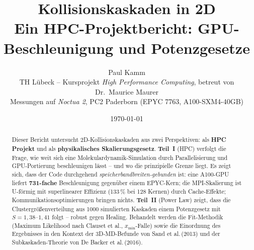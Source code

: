 \documentclass[11pt,a4paper]{article}
\title{Kollisionskaskaden in 2D\\[0.2em]
\large Ein HPC-Projektbericht: GPU-Beschleunigung und Potenzgesetze}
\author{Paul Kamm\\
\small TH L\"ubeck -- Kursprojekt \emph{High Performance Computing}, betreut von Dr.\ Maurice Maurer\\
\small Messungen auf \emph{Noctua 2}, PC2 Paderborn (EPYC 7763, A100-SXM4-40GB)}
\date{\today}
\begin{document}
\maketitle

\begin{abstract}
\noindent
Dieser Bericht untersucht 2D-Kollisionskaskaden aus zwei Perspektiven: als
\textbf{HPC Projekt} und als \textbf{physikalisches Skalierungsgesetz}.
\textbf{Teil~I} (HPC) verfolgt die Frage, wie weit sich eine
Molekulardynamik-Simulation durch Parallelisierung und GPU-Portierung beschleunigen
lässt -- und wo die prinzipielle Grenze liegt. Es zeigt sich, dass der Code
durchgehend \emph{speicherbandbreiten-gebunden} ist: eine A100-GPU liefert
\textbf{731-fache} Beschleunigung gegenüber einem EPYC-Kern; die MPI-Skalierung
ist U-förmig mit superlinearer Effizienz (133\,\% bei 128 Kernen) durch
Cache-Effekte; Kommunikationsoptimierungen bringen nichts.
\textbf{Teil~II} (Power Law) zeigt, dass die Clustergrößenverteilung
aus 1000 simulierten Kaskaden einem Potenzgesetz mit $S = 1{,}38$--$1{,}41$
folgt -- robust gegen Healing. Behandelt werden die Fit-Methodik (Maximum
Likelihood nach Clauset et al., $x_\text{min}$-Falle) sowie die Einordnung des Ergebnisses
in den Kontext der 3D-MD-Befunde von Sand et al.\,(2013) und der
Subkaskaden-Theorie von De Backer et al.\,(2016).
\end{abstract}

\newpage
{\footnotesize
\makeatletter
\renewcommand*\l@part[2]{%
  \ifnum \c@tocdepth >-2\relax
    \addpenalty\@secpenalty
    \addvspace{1.3em \@plus\p@}%
    \setlength\@tempdima{3em}%
    \begingroup
      \parindent \z@ \rightskip \@pnumwidth
      \parfillskip -\@pnumwidth
      {\leavevmode
       \large \bfseries #1\hfil
       \hb@xt@\@pnumwidth{\hss #2%
                          \kern-\p@\kern\p@}}\par
       \nobreak
    \endgroup
  \fi}
\renewcommand*\l@section[2]{%
  \ifnum \c@tocdepth >\z@
    \addpenalty\@secpenalty
    \addvspace{0.4em \@plus\p@}%
    \setlength\@tempdima{1.5em}%
    \begingroup
      \parindent \z@ \rightskip \@pnumwidth
      \parfillskip -\@pnumwidth
      \leavevmode \bfseries
      \advance\leftskip\@tempdima
      \hskip -\leftskip
      #1\nobreak\hfil
      \nobreak\hb@xt@\@pnumwidth{\hss #2%
                                 \kern-\p@\kern\p@}\par
    \endgroup
  \fi}
\makeatother
\tableofcontents}
\vspace{1em}

\newpage
\FloatBarrier
\end{document}
